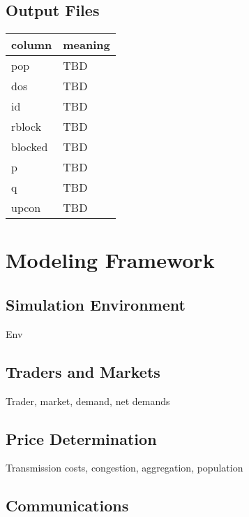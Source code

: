 \documentclass[12pt]{article}
\begin{document}
\subsection{Output Files}

\begin{tabular} {| l | l |}
    \hline
    \textbf{column} & \textbf{meaning} \\ \hline
    pop & TBD \\ \hline
    dos & TBD \\ \hline
    id & TBD \\ \hline
    rblock & TBD \\ \hline
    blocked & TBD \\ \hline
    p & TBD \\ \hline
    q & TBD \\ \hline
    upcon & TBD \\ \hline
\end{tabular}

\section{Modeling Framework}

\subsection{Simulation Environment}

Env

\subsection{Traders and Markets}

Trader, market, demand, net demands 

\subsection{Price Determination}

Transmission costs, congestion, aggregation, population

\subsection{Communications}
\end{document}
